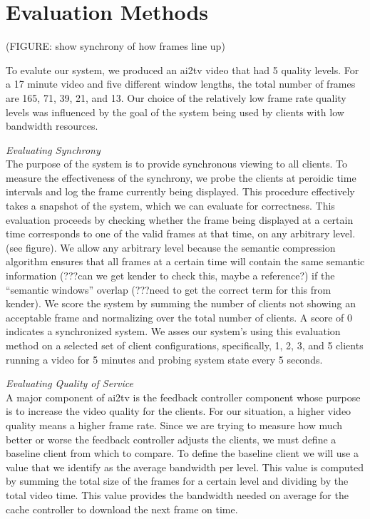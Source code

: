 \documentclass{sig-alternate}
\begin{document}


\section{Evaluation Methods} \label{eval}

(FIGURE: show synchrony of how frames line up)

To evalute our system, we produced an ai2tv video that had 5 quality
levels.  For a 17 minute video and five different window lengths, the
total number of frames are 165, 71, 39, 21, and 13.  Our choice of the
relatively low frame rate quality levels was influenced by the goal of
the system being used by clients with low bandwidth resources.
 

\textit{Evaluating Synchrony} \\ The purpose of the system is to
provide synchronous viewing to all clients.  To measure the
effectiveness of the synchrony, we probe the clients at peroidic time
intervals and log the frame currently being displayed.  This procedure
effectively takes a snapshot of the system, which we can evaluate for
correctness.  This evaluation proceeds by checking whether the frame
being displayed at a certain time corresponds to one of the valid
frames at that time, on any arbitrary level.  (see figure).  We allow
any arbitrary level because the semantic compression algorithm ensures
that all frames at a certain time will contain the same semantic
information (???can we get kender to check this, maybe a reference?)
if the ``semantic windows'' overlap (???need to get the correct term
for this from kender).  We score the system by summing the number of
clients not showing an acceptable frame and normalizing over the total
number of clients.  A score of 0 indicates a synchronized system.  We
asses our system's using this evaluation method on a selected set of
client configurations, specifically, 1, 2, 3, and 5 clients running a
video for 5 minutes and probing system state every 5 seconds.

\textit{Evaluating Quality of Service} \\
A major component of ai2tv is the feedback controller component whose
purpose is to increase the video quality for the clients.  For our
situation, a higher video quality means a higher frame rate.  Since we
are trying to measure how much better or worse the feedback controller
adjusts the clients, we must define a baseline client from which to
compare.  To define the baseline client we will use a value that we
identify as the average bandwidth per level.  This value is computed
by summing the total size of the frames for a certain level and
dividing by the total video time.  This value provides the bandwidth
needed on average for the cache controller to download the next frame
on time.
\end{document}
